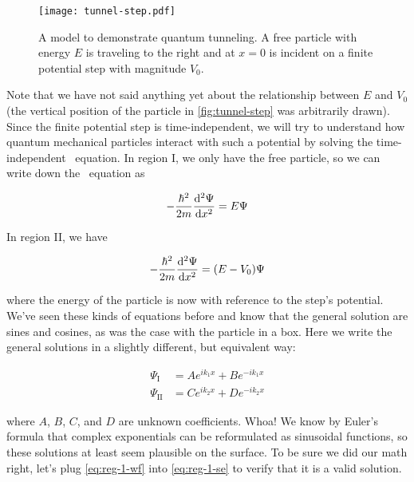 \begin{figure}[!h]
	\centering
	\texttt{[image: tunnel-step.pdf]}
	\caption{A model to demonstrate quantum tunneling. 
	A free particle with energy $E$ is traveling to the right and at $x=0$ is incident on a finite potential step with magnitude $V_0$.}
	\label{fig:tunnel-step}
\end{figure}

Note that we have not said anything yet about the relationship between $E$ and $V_0$ (the vertical position of the particle in \autoref{fig:tunnel-step} was arbitrarily drawn). 
Since the finite potential step is time-independent, we will try to understand how quantum mechanical particles interact with such a potential by solving the time-independent \Sch\ equation. 
In region I, we only have the free particle, so we can write down the \Sch\ equation as 

\begin{equation}
	-\frac{\hbar^2}{2m} \dv[2]{\Psi}{x} = E\Psi \label{eq:reg-1-se}
\end{equation}

In region II, we have

\begin{equation}
	-\frac{\hbar^2}{2m} \dv[2]{\Psi}{x} = (E-V_0)\Psi \label{eq:reg-2-se}
\end{equation}

\noindent where the energy of the particle is now with reference to the step's potential. 
We've seen these kinds of equations before and know that the general solution are sines and cosines, as was the case with the particle in a box. 
Here we write the general solutions in a slightly different, but equivalent way:

\begin{tcolorbox}[title = Traveling wave solutions] \vspace{-2ex}
	\begin{align}
		\Psi_{\text{I}} &= Ae^{ik_1x} + Be^{-ik_1x} \label{eq:reg-1-wf} \\
		\Psi_{\text{II}} &= Ce^{ik_2x} + De^{-ik_2x} \label{eq:reg-2-wf} 
	\end{align}
\end{tcolorbox}

\noindent where $A$, $B$, $C$, and $D$ are unknown coefficients. 
Whoa! 
We know by Euler's formula that complex exponentials can be reformulated as sinusoidal functions, so these solutions at least seem plausible on the surface. 
To be sure we did our math right, let's plug \autoref{eq:reg-1-wf} into \autoref{eq:reg-1-se} to verify that it is a valid solution.

